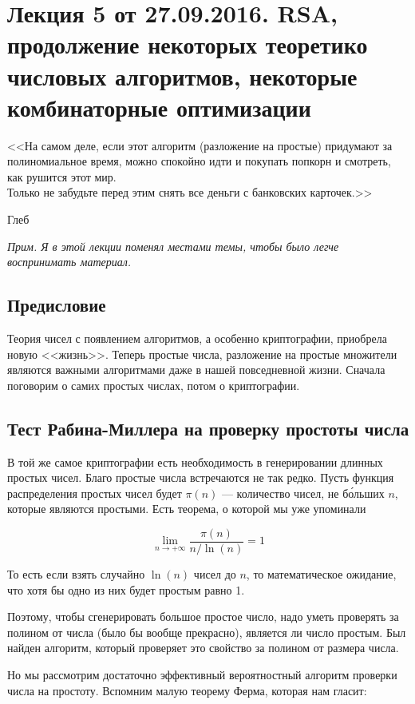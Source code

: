 \documentclass[a4paper, 12pt]{article}
\begin{document}
\pagestyle{fancy}

\section{Лекция 5 от 27.09.2016. RSA, продолжение некоторых теоретико числовых
алгоритмов, некоторые комбинаторные оптимизации}
\epigraph{<<На самом деле, если этот алгоритм (разложение на простые) 
придумают за полиномиальное время, можно спокойно идти и покупать
попкорн и смотреть, как рушится этот мир.
\\
Только не забудьте перед этим снять все деньги с банковских карточек.>>}
{Глеб}

\textit{Прим. Я в этой лекции поменял местами темы, чтобы было легче воспринимать
материал.}

\subsection{Предисловие}

Теория чисел с появлением алгоритмов, а особенно криптографии, приобрела новую 
<<жизнь>>. Теперь простые числа, разложение на простые множители являются
важными алгоритмами даже в нашей повседневной жизни. Сначала поговорим о самих
простых числах, потом о криптографии.

\subsection{Тест Рабина-Миллера на проверку простоты числа}

В той же самое криптографии есть необходимость в генерировании длинных простых
чисел. Благо простые числа встречаются не так редко. Пусть
функция распределения простых чисел будет $\pi(n)$ --- количество
чисел, не б\'{о}льших $n$, которые являются простыми. Есть теорема, о которой
мы уже упоминали

\[
  \lim\limits_{n \to +\infty} \frac{\pi(n)}{n/\ln(n)} = 1
\]

То есть если взять случайно $\ln(n)$ чисел до $n$, то математическое ожидание, что
хотя бы одно из них будет простым равно 1.

Поэтому, чтобы сгенерировать большое простое число, надо уметь проверять за
полином от числа (было бы вообще прекрасно), является ли число простым. Был
найден алгоритм, который проверяет это свойство за полином от размера числа.

Но мы рассмотрим достаточно эффективный вероятностный алгоритм проверки числа
на простоту. Вспомним малую теорему Ферма, которая нам гласит:
\end{document}
